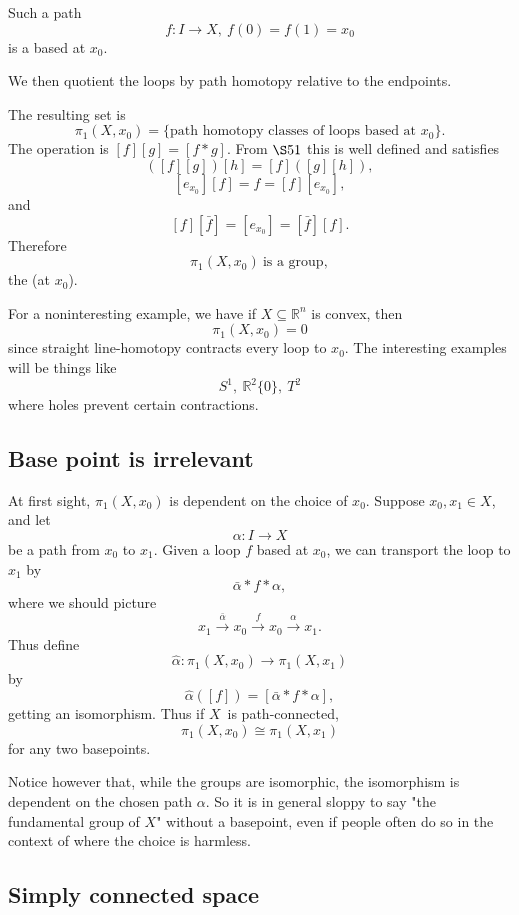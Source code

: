 \documentclass[11pt]{article}
\begin{document}
Such a path
\[
    f : I \to X, \ f(0) = f(1) = x_0 
\]
is a  based at $x_0$.

We then quotient the loops by path homotopy relative 
to the endpoints.

The resulting set is 
\[
    \pi_1(X,x_0) = \{\text{path homotopy classes of 
    loops based at $x_0$}\}.
\]
The operation is 
$[f][g] = [f*g]$. 
From $\S 51$ this is well defined and satisfies 
\[
    ([f][g])[h] = [f]([g][h]),
\]
\[
    [e_{x_0}][f] = f = [f][e_{x_0}], 
\]
and 
\[
    [f][\bar f] = [e_{x_0}]
    = [\bar f][f].
\]
Therefore 
\[
    \pi_{1}(X,x_0) \ \text{is a group},
\]
the  (at $x_0$).

For a noninteresting example, we have if $X \subseteq \mathbb R^n$ 
is convex, then 
\[
    \pi_1(X,x_0) = 0
\]
since straight line-homotopy contracts every loop to $x_0$.
The interesting examples will be things like 
\[
    S^1, \ \mathbb R^2\{0\}, \ T^2
\]
where holes prevent certain contractions.

\subsection{Base point is irrelevant}

At first sight, $\pi_1(X,x_0)$ is dependent 
on the choice of $x_0$. 
Suppose $x_0,x_1 \in X$, and let 
\[
    \alpha : I \to X
\]
be a path from $x_0$ to $x_1$. 
Given a loop $f$ based at $x_0$, we can transport the 
loop to $x_1$ by 
\[
    \bar \alpha * f * \alpha, 
\]
where we should picture 
\[
    x_1 \overset{\bar \alpha}\longrightarrow 
    x_0 \overset f \longrightarrow x_0 
    \overset \alpha \longrightarrow x_1.
\]
Thus define 
\[
    \widehat \alpha : \pi_1(X,x_0) \to \pi_1(X,x_1)
\]
by 
\[
    \widehat \alpha([f]) 
    = [\bar \alpha * f * \alpha], 
\]
getting an isomorphism. Thus if $X$ is 
path-connected, 
\[
    \pi_1(X,x_0) \cong \pi_1(X,x_1)
\]
for any two basepoints. 

Notice however that, while the groups 
are isomorphic, the isomorphism is dependent on the 
chosen path $\alpha$. So it is in general sloppy 
to say "the fundamental group of $X$" without a basepoint, 
even if people often do so in the context of where the choice 
is harmless.

\subsection{Simply connected space}
\end{document}
